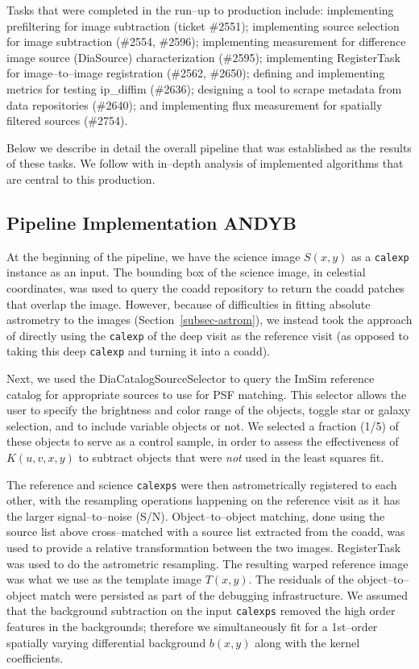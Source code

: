 \documentclass[prd, nofootinbib, floatfix, 11pt,tightenlines,times]{article}
\begin{document}
Tasks that were completed in the run--up to production include:
implementing prefiltering for image subtraction (ticket \#2551);
implementing source selection for image subtraction (\#2554, \#2596);
implementing measurement for difference image source (DiaSource)
characterization (\#2595); implementing RegisterTask for
image--to--image registration (\#2562, \#2650); defining and
implementing metrics for testing ip\_diffim (\#2636); designing a tool
to scrape metadata from data repositories (\#2640); and implementing
flux measurement for spatially filtered sources (\#2754).

Below we describe in detail the overall pipeline that was established
as the results of these tasks.  We follow with in--depth analysis of
implemented algorithms that are central to this production.

\subsection{Pipeline Implementation {\bf ANDYB}}

At the beginning of the pipeline, we have the science image $S(x,y)$
as a {\tt calexp} instance as an input.  The bounding box of the
science image, in celestial coordinates, was used to query the coadd
repository to return the coadd patches that overlap the image.
However, because of difficulties in fitting absolute astrometry to the
images (Section~\ref{subsec-astrom}), we instead took the approach of
directly using the {\tt calexp} of the deep visit as the reference
visit (as opposed to taking this deep {\tt calexp} and turning it into
a coadd).

Next, we used the DiaCatalogSourceSelector to query the ImSim
reference catalog for appropriate sources to use for PSF matching.
This selector allows the user to specify the brightness and color
range of the objects, toggle star or galaxy selection, and to include
variable objects or not.  We selected a fraction (1/5) of these
objects to serve as a control sample, in order to assess the
effectiveness of $K(u,v,x,y)$ to subtract objects that were {\it not}
used in the least squares fit.

The reference and science {\tt calexps} were then astrometrically
registered to each other, with the resampling operations happening on
the reference visit as it has the larger signal--to--noise (S/N).
Object--to--object matching, done using the source list above
cross--matched with a source list extracted from the coadd, was used
to provide a relative transformation between the two images.
RegisterTask was used to do the astrometric resampling.  The resulting
warped reference image was what we use as the template image $T(x,y)$.
The residuals of the object--to--object match were persisted as part
of the debugging infrastructure.  We assumed that the background
subtraction on the input {\tt calexps} removed the high order features
in the backgrounds; therefore we simultaneously fit for a 1st--order
spatially varying differential background $b(x,y)$ along with the
kernel coefficients.
\end{document}

